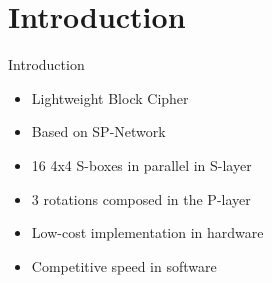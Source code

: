 \section{Introduction}

\begin{frame}{Introduction}
\begin{block}{}
    \begin{itemize}
    \item Lightweight Block Cipher
    \item Based on SP-Network
    \item 16 4x4 S-boxes in parallel in S-layer
    \item 3 rotations composed in the P-layer
    \item Low-cost implementation in hardware
    \item Competitive speed in software
\end{itemize}
\end{block}

\end{frame}

